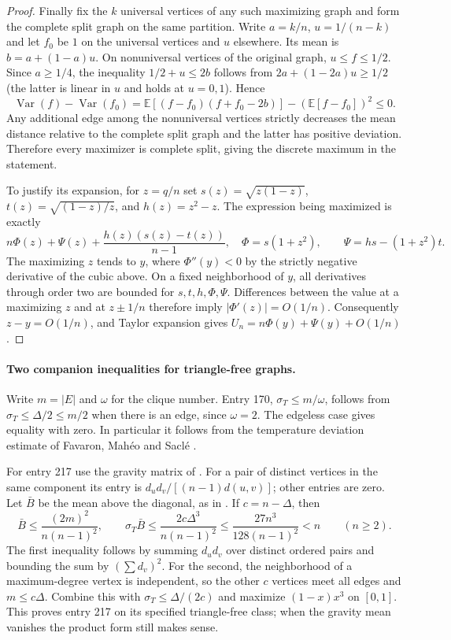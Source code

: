 \documentclass[11pt,a4paper]{article}
\theoremstyle{remark}\newtheorem*{remark}{Remark}
\begin{document}
\begin{proof}
Finally fix the $k$ universal vertices of any such maximizing graph and
form the complete split graph on the same partition. Write $a=k/n$,
$u=1/(n-k)$ and let $f_0$ be $1$ on the universal vertices and $u$
elsewhere. Its mean is $b=a+(1-a)u$. On nonuniversal vertices of the
original graph, $u\le f\le1/2$. Since $a\ge1/4$, the inequality
$1/2+u\le2b$ follows from $2a+(1-2a)u\ge1/2$
(the latter is linear in $u$ and holds at $u=0,1$). Hence
\[
 \operatorname{Var}(f)-\operatorname{Var}(f_0)
 =\mathbb E[(f-f_0)(f+f_0-2b)]-
       (\mathbb E[f-f_0])^2\le0 .
\]
Any additional edge among the nonuniversal vertices strictly decreases
the mean distance relative to the complete split graph and the latter
has positive deviation. Therefore every maximizer is complete split,
giving the discrete maximum in the statement.

To justify its expansion, for $z=q/n$ set $s(z)=\sqrt{z(1-z)}$,
$t(z)=\sqrt{(1-z)/z}$, and $h(z)=z^2-z$. The expression being maximized is exactly
\[
 n\Phi(z)+\Psi(z)+\frac{h(z)(s(z)-t(z))}{n-1},
 \quad
 \Phi=s(1+z^2),\qquad \Psi=hs-(1+z^2)t .
\]
The maximizing $z$ tends to $y$, where $\Phi''(y)<0$ by the
strictly negative derivative of the cubic above. On a fixed
neighborhood of $y$, all derivatives through order two are bounded
for $s,t,h,\Phi,\Psi$. Differences between the value at a maximizing
$z$ and at $z\pm1/n$ therefore imply $|\Phi'(z)|=O(1/n)$.
Consequently $z-y=O(1/n)$, and Taylor expansion gives
$U_n=n\Phi(y)+\Psi(y)+O(1/n)$.
\end{proof}

\paragraph{Two companion inequalities for triangle-free graphs.}
Write $m=|E|$ and $\omega$ for the clique number. Entry 170,
$\sigma_T\le m/\omega$, follows from $\sigma_T\le\Delta/2\le m/2$
when there is an edge, since $\omega=2$. The edgeless case gives
equality with zero. In particular it follows from the temperature
deviation estimate of Favaron, Mah\'eo and Sacl\'e
\cite[proof of conjecture 272]{temp171fms}.

For entry 217 use the gravity matrix of \cite[p.~52]{wow}.
For a pair of distinct vertices in the same component its entry is
$d_ud_v/[(n-1)d(u,v)]$; other entries are zero.
Let $\bar B$ be the mean above the diagonal, as in
\cite[glossary]{temp171bdf}. If $c=n-\Delta$, then
\[
 \bar B\le\frac{(2m)^2}{n(n-1)^2},\qquad
 \sigma_T\bar B\le\frac{2c\Delta^3}{n(n-1)^2}
 \le\frac{27n^3}{128(n-1)^2}< n\qquad(n\ge2).
\]
The first inequality follows by summing $d_ud_v$ over distinct ordered
pairs and bounding the sum by $(\sum d_v)^2$. For the second, the
neighborhood of a maximum-degree vertex is independent, so the other
$c$ vertices meet all edges and $m\le c\Delta$. Combine this with
$\sigma_T\le\Delta/(2c)$ and maximize $(1-x)x^3$ on $[0,1]$. This
proves entry 217 on its specified triangle-free class; when the
gravity mean vanishes the product form still makes sense.
\end{document}
